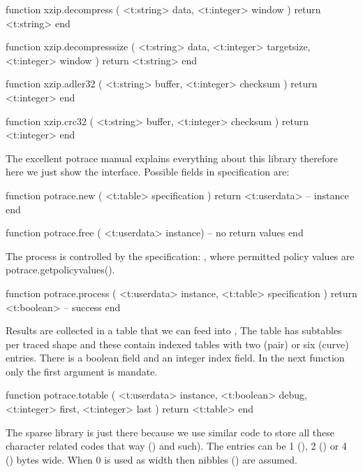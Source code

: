 function xzip.decompress (
    <t:string>  data,
    <t:integer> window
)
    return <t:string>
end

function xzip.decompresssize (
    <t:string>  data,
    <t:integer> targetsize,
    <t:integer> window
)
    return <t:string>
end

function xzip.adler32 (
    <t:string>  buffer,
    <t:integer> checksum
)
    return <t:integer>
end

function xzip.crc32 (
    <t:string>  buffer,
    <t:integer> checksum
)
    return <t:integer>
end
\stoptyping

\stopsubsection

\startsubsection[title=Potrace]

The excellent potrace manual explains everything about this library therefore
here we just show the interface. Possible fields in specification are:

\starttyping[option=LUA]
function potrace.new ( <t:table> specification )
    return <t:userdata> -- instance
end
\stoptyping


\starttyping[option=LUA]
function potrace.free ( <t:userdata> instance)
    -- no return values
end
\stoptyping

The process is controlled by the specification: , where permitted policy values are \showenginekeylist
{potrace.getpolicyvalues()}.

\starttyping[option=LUA]
function potrace.process ( <t:userdata> instance, <t:table> specification )
    return <t:boolean> -- success
end
\stoptyping

Results are collected in a table that we can feed into \METAPOST, The table has
subtables per traced shape and these contain indexed tables with two (pair) or
six (curve) entries. There is a boolean  field and an integer \type
{index} field. In the next function only the first argument is mandate.

\starttyping[option=LUA]
function potrace.totable  (
    <t:userdata> instance,
    <t:boolean>  debug,
    <t:integer>  first,
    <t:integer>  last
)
    return <t:table>
end
\stoptyping

\stopsubsection

\startsubsection[title=Sparse hashes]

The sparse library is just there because we use similar code to store all these
character related codes that way (\type {\lccode}) and such). The entries can be
1 (), 2 () or 4 () bytes wide. When 0
is used as width then nibbles () are assumed.

